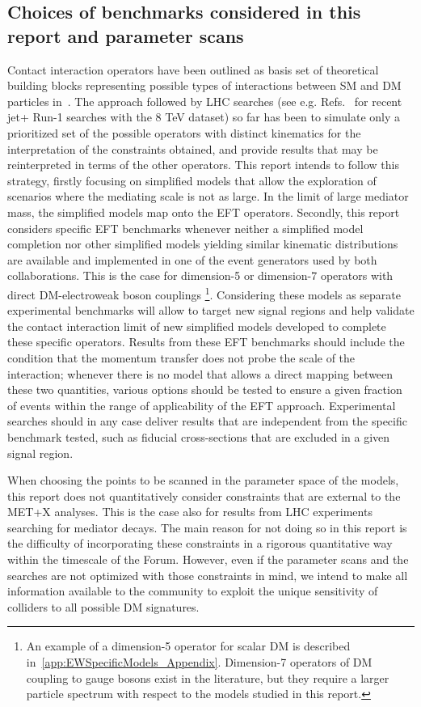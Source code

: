 \subsection{Choices of benchmarks considered in this report and parameter scans}

Contact interaction operators have been outlined as basis set of theoretical
building blocks representing possible types of interactions between SM and DM particles
in~\cite{Goodman:2010ku}. The approach followed by LHC searches (see e.g. Refs.~\cite{Khachatryan:2014rra,Aad:2015zva} 
for recent jet+\MET{} Run-1 searches with the 8 TeV dataset) 
so far has been to simulate only a prioritized set of the possible operators with distinct kinematics
for the interpretation of the constraints obtained, and provide results that may be reinterpreted in terms of the other operators.
This report intends to follow this strategy, firstly focusing on simplified models that allow the exploration 
of scenarios where the mediating scale is not as large.  In the limit of large mediator mass, the simplified models map onto
the EFT operators.
Secondly, this report considers specific EFT benchmarks 
whenever neither a simplified model completion 
nor other simplified models yielding similar kinematic distributions are available 
and implemented in one of the event generators used by both collaborations. 
This is the case for dimension-5 or dimension-7 operators with direct 
DM-electroweak boson couplings \footnote{An example of a dimension-5 operator for scalar
DM is described in~\ref{app:EWSpecificModels_Appendix}. 
Dimension-7 operators of DM coupling to gauge bosons exist in the literature, but they require a larger particle spectrum
with respect to the models studied in this report.}.
Considering these models as separate experimental benchmarks 
will allow to target new signal regions and help validate the 
contact interaction limit of new simplified models 
developed to complete these specific operators. 
Results from these EFT benchmarks should include the condition that
the momentum transfer does not probe the scale of the interaction; whenever there is no model
that allows a direct mapping between these two quantities, various options should be tested to 
ensure a given fraction of events within the range of applicability of the EFT approach.
Experimental searches should in any case deliver 
results that are independent from the specific benchmark tested, such as fiducial cross-sections that
are excluded in a given signal region. 

When choosing the points to be scanned in the parameter space of the models,
this report does not quantitatively consider constraints that are 
external to the MET+X analyses. This is the case also for results from LHC experiments
searching for mediator decays. 
The main reason for not doing so in this report 
is the difficulty of incorporating these constraints in a rigorous quantitative way within
the timescale of the Forum. However, even if the parameter scans
and the searches are not optimized with those constraints in mind, 
we intend to make all information available to the community to exploit
the unique sensitivity of colliders to all possible DM signatures. 

